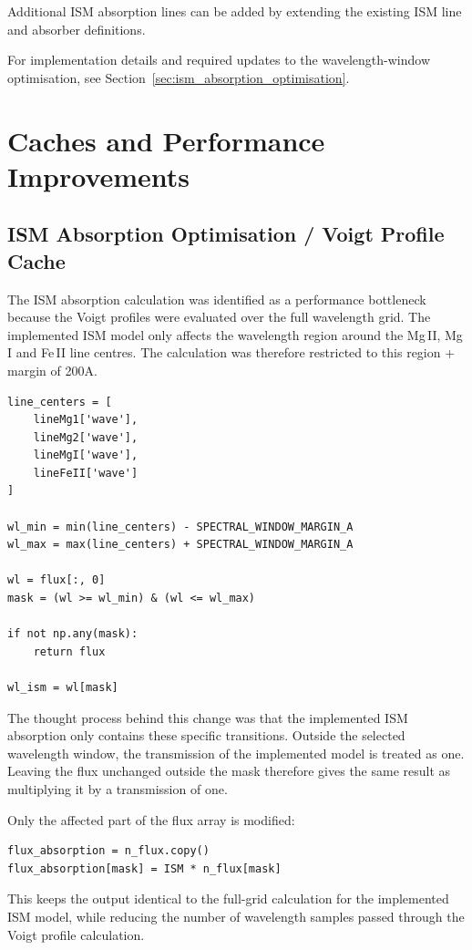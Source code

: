 Additional ISM absorption lines can be added by extending the existing ISM line and absorber definitions.

For implementation details and required updates to the wavelength-window optimisation, see Section~\ref{sec:ism_absorption_optimisation}.

\newpage

\section{Caches and Performance Improvements}

\subsection{ISM Absorption Optimisation / Voigt Profile Cache}
\label{sec:voigt_cache}
The ISM absorption calculation was identified as a performance bottleneck because the Voigt profiles were evaluated over the full wavelength grid. The implemented ISM model only affects the wavelength region around the Mg\,II, Mg\,I and Fe\,II line centres. The calculation was therefore restricted to this region + margin of 200A.

\begin{verbatim}
line_centers = [
    lineMg1['wave'],
    lineMg2['wave'],
    lineMgI['wave'],
    lineFeII['wave']
]

wl_min = min(line_centers) - SPECTRAL_WINDOW_MARGIN_A
wl_max = max(line_centers) + SPECTRAL_WINDOW_MARGIN_A

wl = flux[:, 0]
mask = (wl >= wl_min) & (wl <= wl_max)

if not np.any(mask):
    return flux

wl_ism = wl[mask]
\end{verbatim}

The thought process behind this change was that the implemented ISM absorption only contains these specific transitions. Outside the selected wavelength window, the transmission of the implemented model is treated as one. Leaving the flux unchanged outside the mask therefore gives the same result as multiplying it by a transmission of one.

Only the affected part of the flux array is modified:

\begin{verbatim}
flux_absorption = n_flux.copy()
flux_absorption[mask] = ISM * n_flux[mask]
\end{verbatim}

This keeps the output identical to the full-grid calculation for the implemented ISM model, while reducing the number of wavelength samples passed through the Voigt profile calculation.

